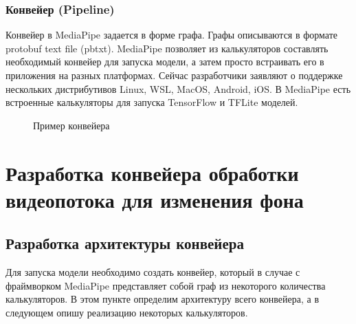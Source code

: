 \documentclass[a4paper,14pt]{extreport}
\begin{document}
        \subsection{Конвейер (Pipeline)}
        Конвейер в MediaPipe задается в форме графа. Графы описываются в формате protobuf text file (pbtxt). MediaPipe позволяет из калькуляторов составлять необходимый конвейер для запуска модели, а затем просто встраивать его в приложения на разных платформах. Сейчас разработчики заявляют о поддержке нескольких дистрибутивов Linux, WSL, MacOS, Android, iOS. В MediaPipe есть встроенные калькуляторы для запуска TensorFlow и TFLite моделей.
        \begin{figure}[h]
            \caption{Пример конвейера}
            \label{ris:subgraph}
        \end{figure}

    \chapter{Разработка конвейера обработки видеопотока для изменения фона}
        \section{Разработка архитектуры конвейера}
        Для запуска модели необходимо создать конвейер, который в случае с фраймворком MediaPipe представляет собой граф из некоторого количества калькуляторов. В этом пункте определим архитектуру всего конвейера, а в следующем опишу реализацию некоторых калькуляторов.
\end{document}
